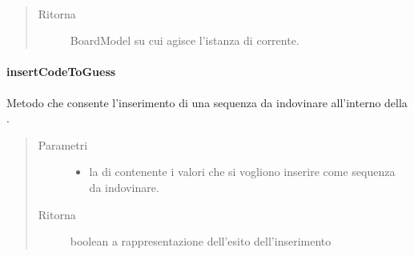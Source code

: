 \documentclass[letterpaper,10pt,italian]{sphinxmanual}
\begin{document}
\begin{fulllineitems}
\label{\detokenize{source/it/unicam/cs/pa/mastermind/gamecore/BoardController:it.unicam.cs.pa.mastermind.gamecore.BoardController.getBoardReference()}}~\begin{quote}\begin{description}
\item[{Ritorna}] \leavevmode
BoardModel su cui agisce l’istanza di  corrente.

\end{description}\end{quote}

\end{fulllineitems}



\paragraph{insertCodeToGuess}
\label{\detokenize{source/it/unicam/cs/pa/mastermind/gamecore/BoardController:insertcodetoguess}}

\begin{fulllineitems}
\label{\detokenize{source/it/unicam/cs/pa/mastermind/gamecore/BoardController:it.unicam.cs.pa.mastermind.gamecore.BoardController.insertCodeToGuess(List)}}
Metodo che consente l’inserimento di una sequenza da indovinare all’interno della .
\begin{quote}\begin{description}
\item[{Parametri}] \leavevmode\begin{itemize}
\item {} 
 \textendash{} la  di  contenente i valori che si vogliono inserire come sequenza da indovinare.

\end{itemize}

\item[{Ritorna}] \leavevmode
boolean a rappresentazione dell’esito dell’inserimento

\end{description}\end{quote}

\end{fulllineitems}
\end{document}
